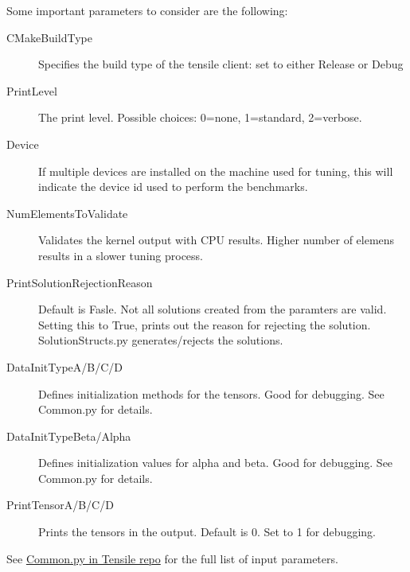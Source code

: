 \documentclass[]{article}
\begin{document}
\noindent
Some important parameters to consider are the following:
\begin{description}
\item[CMakeBuildType] Specifies the build type of the tensile client: set to either Release or Debug
\item[PrintLevel] The print level. Possible choices: 0=none, 1=standard, 2=verbose.
\item[Device] If multiple devices are installed on the machine used for tuning, this will indicate the device id used to perform the benchmarks.
\item[NumElementsToValidate] Validates the kernel output with CPU results. Higher number of elemens results in a slower tuning process.
\item[PrintSolutionRejectionReason] Default is Fasle. Not all solutions created from the paramters are valid. Setting this to True, prints out the reason for rejecting the solution. SolutionStructs.py generates/rejects the solutions.
\item[DataInitTypeA/B/C/D] Defines initialization methods for the tensors. Good for debugging. See Common.py for details.
\item[DataInitTypeBeta/Alpha] Defines initialization values for alpha and beta. Good for debugging. See Common.py for details.
\item[PrintTensorA/B/C/D] Prints the tensors in the output. Default is 0. Set to 1 for debugging.
\end{description}

\noindent
See \href{https://github.com/ROCmSoftwarePlatform/Tensile/blob/master/Tensile/Common.py}{Common.py in Tensile repo} for the full list of input parameters.
\end{document}
